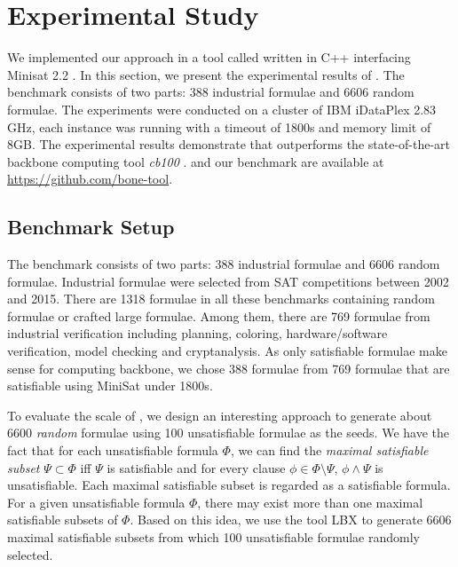 \section{Experimental Study}\label{sec:expr}
We implemented our approach in a tool called \tool written in C++ interfacing Minisat 2.2 \cite{MINISAT}.
In this section, we present the experimental results of \tool.
The benchmark consists of two parts: 388 industrial formulae and 6606 random formulae.
The experiments were conducted on a cluster of IBM iDataPlex 2.83 GHz, each instance was running with a timeout of 1800s and memory limit of 8GB.
The experimental results demonstrate that \tool outperforms the  state-of-the-art backbone computing tool
\textit{cb100} \cite{JLM15}. \tool and our benchmark are available at \url{https://github.com/bone-tool}.

\subsection{Benchmark Setup}
The benchmark consists of two parts: 388 industrial formulae and 6606 random formulae.
Industrial formulae were selected from SAT competitions between 2002 and 2015.
There are 1318 formulae in all these benchmarks containing random formulae or crafted large formulae.
Among them, there are 769 formulae from industrial verification including planning, coloring, hardware/software verification, model checking and cryptanalysis.
As only satisfiable formulae make sense for computing backbone, we chose 388 formulae from 769 formulae that are satisfiable using MiniSat under 1800s.


To evaluate the scale  of \tool, we design an interesting approach to generate about 6600 \textit{random} formulae using 100 unsatisfiable formulae as the seeds. We have the fact that for each unsatisfiable formula $\Phi$, we can find the \textit{maximal satisfiable subset} $\Psi\subset \Phi$
iff $\Psi$ is satisfiable and for every clause $\phi\in\Phi\setminus \Psi$, $\phi\wedge \Psi$ is unsatisfiable.
Each maximal satisfiable subset is regarded as a satisfiable formula.
For a given unsatisfiable formula $\Phi$, there may exist more than one maximal satisfiable subsets of $\Phi$. Based on this idea, we use the tool LBX \cite{MPA2015} to generate 6606 maximal satisfiable subsets from which 100 unsatisfiable formulae randomly selected.







